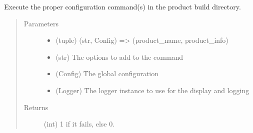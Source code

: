 \documentclass[a4paper,10pt,english]{sphinxmanual}
\begin{document}
\begin{fulllineitems}
\label{\detokenize{apidoc_commands/commands:commands.configure.configure_product}}
Execute the proper configuration command(s) 
in the product build directory.
\begin{quote}\begin{description}
\item[{Parameters}] \leavevmode\begin{itemize}
\item {} 
 \textendash{} (tuple) 
(str, Config) =\textgreater{} (product\_name, product\_info)

\item {} 
 \textendash{} (str) The options to add to the command

\item {} 
 \textendash{} (Config) The global configuration

\item {} 
 \textendash{} (Logger) 
The logger instance to use for the display and logging

\end{itemize}

\item[{Returns}] \leavevmode
(int) 1 if it fails, else 0.

\end{description}\end{quote}

\end{fulllineitems}

\end{document}
